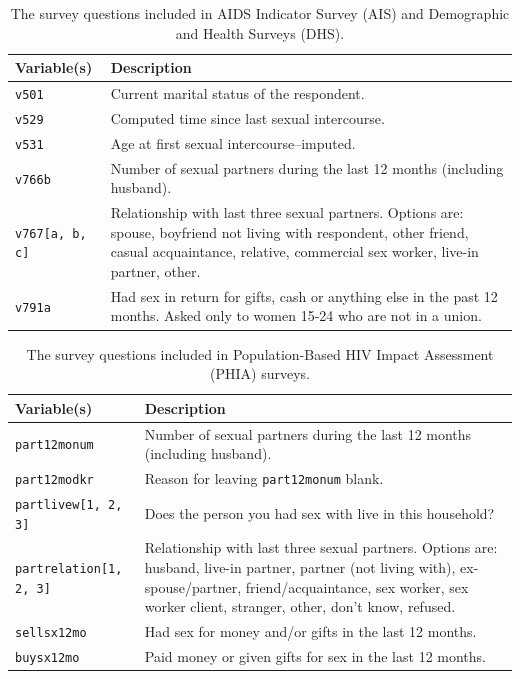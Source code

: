 \documentclass[a4paper, nobind]{templates/ociamthesis}
\begin{document}
\begin{table}[h]
\centering
\begin{tabularx}{\textwidth}{lX}
\toprule
Variable(s) & Description \\
\midrule
\texttt{v501} & Current marital status of the respondent. \\
\texttt{v529} & Computed time since last sexual intercourse. \\
\texttt{v531} & Age at first sexual intercourse--imputed. \\
\texttt{v766b} & Number of sexual partners during the last 12 months (including husband). \\
\texttt{v767[a, b, c]} & Relationship with last three sexual partners. Options are: spouse, boyfriend not living with respondent, other friend, casual acquaintance, relative, commercial sex worker, live-in partner, other. \\
\texttt{v791a} & Had sex in return for gifts, cash or anything else in the past 12 months. Asked only to women 15-24 who are not in a union. \\
\bottomrule
\end{tabularx}
\caption{The survey questions included in AIDS Indicator Survey (AIS) and Demographic and Health Surveys (DHS).}
\end{table}

\begin{table}[h]
\centering
\begin{tabularx}{\textwidth}{lX}
\toprule
Variable(s) & Description \\
\midrule
\texttt{part12monum} & Number of sexual partners during the last 12 months (including husband). \\
\texttt{part12modkr} & Reason for leaving \texttt{part12monum} blank. \\
\texttt{partlivew[1, 2, 3]} & Does the person you had sex with live in this household? \\
\texttt{partrelation[1, 2, 3]} & Relationship with last three sexual partners. Options are: husband, live-in partner, partner (not living with), ex-spouse/partner, friend/acquaintance, sex worker, sex worker client, stranger, other, don't know, refused. \\
\texttt{sellsx12mo} & Had sex for money and/or gifts in the last 12 months. \\
\texttt{buysx12mo} & Paid money or given gifts for sex in the last 12 months. \\
\bottomrule
\end{tabularx}
\caption{The survey questions included in Population-Based HIV Impact Assessment (PHIA) surveys.}
\end{table}
\end{document}
